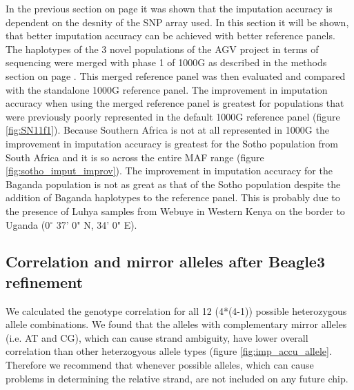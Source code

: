 In the previous section on page \pageref{subsec:thinning} it was shown that the imputation accuracy is dependent on the desnity of the \gls{SNP} array used. In this section it will be shown, that better imputation accuracy can be achieved with better reference panels.
The haplotypes of the 3 novel populations of the \gls{AGV} project\cite{Gurdasani2015} in terms of sequencing were merged with phase 1 of \gls{1000G} as described in the methods section on page \pageref{subsec:panel_merger}. This merged reference panel was then evaluated and compared with the standalone \gls{1000G} reference panel. The improvement in imputation accuracy when using the merged reference panel is greatest for populations that were previously poorly represented in the default \gls{1000G} reference panel (figure \ref{fig:SN11f1}). Because Southern Africa is not at all represented in \gls{1000G} the improvement in imputation accuracy is greatest for the Sotho population from South Africa and it is so across the entire \gls{MAF} range (figure \ref{fig:sotho_imput_improv}). The improvement in imputation accuracy for the Baganda population is not as great as that of the Sotho population despite the addition of Baganda haplotypes to the reference panel. This is probably due to the presence of Luhya samples from Webuye in Western Kenya on the border to Uganda (0$^{\circ}$ 37' 0" N, 34' 0" E).




\subsection{Correlation and mirror alleles after Beagle3 refinement}

We calculated the genotype correlation for all 12 (4*(4-1)) possible heterozygous allele combinations. We found that the alleles with complementary mirror alleles (i.e. AT and CG), which can cause strand ambiguity, have lower overall correlation than other heterzogyous allele types (figure \ref{fig:imp_accu_allele}. Therefore we recommend that whenever possible alleles, which can cause problems in determining the relative strand, are not included on any future chip.

